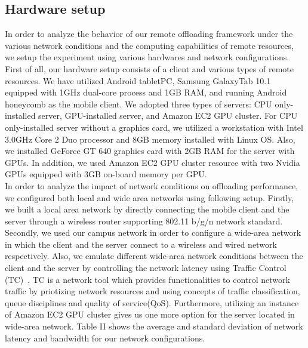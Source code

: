 \documentclass[conference]{IEEEtran}
\begin{document}
\subsection{Hardware setup}
In order to analyze the behavior of our remote offloading framework
under the various network conditions and the computing capabilities of
remote resources, we setup the experiment using various hardwares and
network configurations.
%
First of all, our hardware setup consists of a client and various types of
remote resources.
%
We have utilized Android tabletPC, Samsung GalaxyTab 10.1 equipped with
1GHz dual-core process and 1GB RAM, and running Android honeycomb as the
mobile client.
%
We adopted three types of servers: CPU only-installed server,
GPU-installed server, and Amazon EC2 GPU cluster.
%
For CPU only-installed server without a graphics card, we utilized a
workstation with Intel 3.0GHz Core 2 Duo processor and 8GB memory
installed with Linux OS.
%
Also, we installed GeForce GT 640 graphics card with 2GB RAM for the
server with GPUs.
%
In addition, we used Amazon EC2 GPU cluster resource with two Nvidia
GPUs equipped with 3GB on-board memory per GPU.\\
%
\indent In order to analyze the impact of network conditions on offloading
performance, we configured both local and wide area networks using
following setup.
%
Firstly, we built a local area network by directly connecting the mobile
client and the server through a wireless router supporting 802.11 b/g/n
network standard.
%
Secondly, we used our campus network in order to configure a wide-area
network in which the client and the server connect to a wireless and
wired network respectively.
%
Also, we emulate different wide-area network conditions between the
client and the server by controlling the network latency using Traffic
Control (TC)~\cite{tc}.
%
TC is a network tool which provides functionalities to control network
traffic by priotizing network resources and using concepts of traffic
classification, queue disciplines and quality of service(QoS).
%
Furthermore, utilizing an instance of Amazon EC2 GPU cluster gives us
one more option for the server located in wide-area network.
%
Table II shows the average and standard deviation of network latency and
bandwidth for our network configurations.
%
\end{document}
